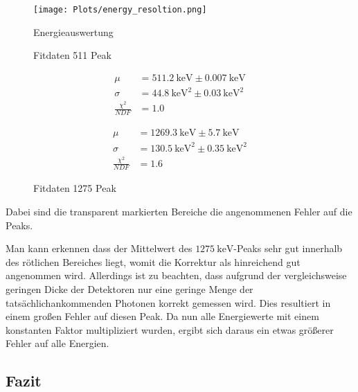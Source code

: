 \documentclass[12pt,twoside,a4paper]{scrartcl}
\begin{document}
		\begin{figure}[H]
			\centering
			\texttt{[image: Plots/energy\_resoltion.png]}
			\caption{Energieauswertung}
		\end{figure}

		\begin{figure}[H]
			\begin{minipage}{0.49 \textwidth}
				\caption{Fitdaten 511 Peak}

				\begin{align*}
					\mu &= \SI{511.2}{\kilo \electronvolt} \pm \SI{0.007}{\kilo \electronvolt} \\
					\sigma &= \SI{44.8}{\kilo \electronvolt \squared} \pm \SI{0.03}{\kilo \electronvolt \squared} \\
					\frac{\chi^2}{NDF} &= 1.0
				\end{align*}

			\end{minipage}
			\begin{minipage}{0.49 \textwidth}
				\caption{Fitdaten 1275 Peak}

				\begin{align*}
					\mu &= \SI{1269.3}{\kilo \electronvolt} \pm \SI{5.7}{\kilo \electronvolt} \\
					\sigma &= \SI{130.5}{\kilo \electronvolt \squared} \pm \SI{0.35}{\kilo \electronvolt \squared} \\
					\frac{\chi^2}{NDF} &= 1.6
				\end{align*}

			\end{minipage}
		\end{figure}


		Dabei sind die transparent markierten Bereiche die angenommenen Fehler auf die Peaks.

		Man kann erkennen dass der Mittelwert des $\SI{1275}{\kilo \electronvolt}$-Peaks sehr gut innerhalb des rötlichen Bereiches liegt, womit die Korrektur als hinreichend gut angenommen wird. Allerdings ist zu beachten, dass aufgrund der vergleichsweise geringen Dicke der Detektoren nur eine geringe Menge der tatsächlichankommenden Photonen korrekt gemessen wird. Dies resultiert in einem großen Fehler auf diesen Peak. Da nun alle Energiewerte mit einem konstanten Faktor multipliziert wurden, ergibt sich daraus ein etwas größerer Fehler auf alle Energien.

\subsection{Fazit}
\end{document}
